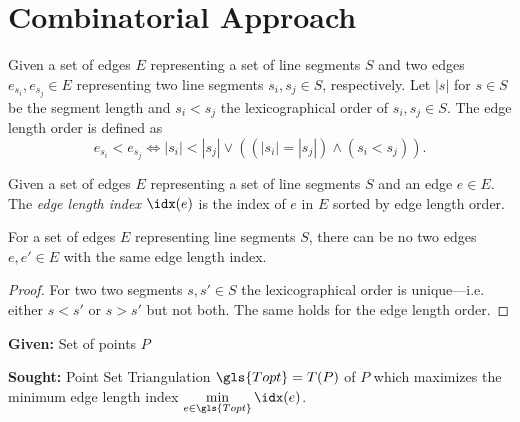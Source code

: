 \section{Combinatorial Approach}


\begin{definition}
  \label{def:edge_length_order}
  Given a set of edges \(E\) representing a set of line segments
  \(S\) and two edges \(e_{s_i}, e_{s_j} \in E\) representing two
  line segments \(s_i,s_j \in S\), respectively. Let \(|s|\) for
  \(s \in S\) be the segment length and \( s_i < s_j \) the
  lexicographical order of \(s_i, s_j \in S\). The edge length
  order is defined as  
  \[
    e_{s_i} < e_{s_j}
    \iff |s_i| < |s_j|
    \lor ((|s_i| = |s_j|) \land (s_i < s_j)).
  \]
\end{definition}


\begin{definition}
  \label{def:edge_length_index}
  Given a set of edges \(E\) representing a set of line segments
  \(S\) and an edge \(e \in E\). The \emph{edge length index}
  \(\idx(e)\) is the index of \(e\) in \(E\) sorted by 
  edge length order.
\end{definition}


\begin{theorem}
  \label{thm:edge_length_index_uniqueness}
  For a set of edges \(E\) representing line segments \(S\),
  there can be no two edges \(e, e' \in E\)
  with the same edge length index.
\end{theorem}

\begin{proof}
  For two two segments \(s, s' \in S\) the lexicographical order is
  unique---i.e. either \(s < s'\) or \(s > s'\) but not both. The
  same holds for the edge length order.
\end{proof}


\begin{problem}
  \label{prob:MELT}\hfill
  \begin{labeling}{\hspace{4em}}
    \item[\textbf{Given:}]
      Set of points \(P\)
    \item[\textbf{Sought:}]
      Point Set Triangulation \(\gls{Topt} = T(P)\) of \(P\)
      which maximizes the minimum edge length index
      \(\min\limits_{e\in \gls{Topt}} \idx(e)\).
  \end{labeling}
\end{problem}

